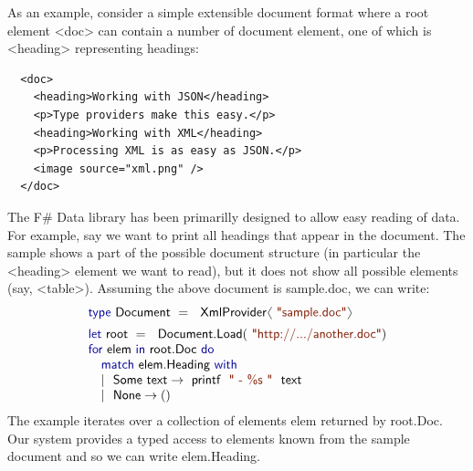 \documentclass[10pt,preprint,clearpagebib]{sigplanconf}
\newcommand{\langl}{\begin{picture}(4.5,7)
\put(1.1,2.5){\rotatebox{60}{\line(1,0){5.5}}}
\put(1.1,2.5){\rotatebox{300}{\line(1,0){5.5}}}
\end{picture}}
\newcommand{\rangl}{\begin{picture}(4.5,7)
\put(.9,2.5){\rotatebox{120}{\line(1,0){5.5}}}
\put(.9,2.5){\rotatebox{240}{\line(1,0){5.5}}}
\end{picture}}
\newcommand{\kvd}[1]{\textnormal{\textcolor{kvdclr}{\sffamily #1}}}
\newcommand{\str}[1]{\textnormal{\textcolor{strclr}{\sffamily "#1"}}}
\newcommand{\strf}[1]{\textnormal{\textcolor{strclr}{\sffamily #1}}}
\newcommand{\ident}[1]{\textnormal{\sffamily #1}}
\begin{document}
As an example, consider a simple extensible document format where a root element
{\ttfamily\small <doc>} can contain a number of document element, one of which is
{\ttfamily\small <heading>} representing headings:
%
{\small{
\begin{verbatim}
  <doc>
    <heading>Working with JSON</heading>
    <p>Type providers make this easy.</p>
    <heading>Working with XML</heading>
    <p>Processing XML is as easy as JSON.</p>
    <image source="xml.png" />
  </doc>
\end{verbatim}
}}
%
\noindent
The F\# Data library has been primarilly designed to allow easy reading of data. For example,
say we want to print all headings that appear in the document. The sample shows a part of the 
possible document structure (in particular the {\ttfamily\small <heading>} element we want to
read), but it does not show all possible elements (say, {\ttfamily\small <table>}). Assuming the
above document is \strf{sample.doc}, we can write:
%
\noindent
\begin{equation*}
\begin{array}{l}
 \kvd{type}~\ident{Document}~=~\ident{XmlProvider}\langl\str{sample.doc}\rangl\hspace{1em} \\[0.5em]
 \kvd{let}~\ident{root}~=~\ident{Document.Load}(\str{http://.../another.doc})\\
 \kvd{for}~\ident{elem}~\kvd{in}~\ident{root.Doc}~\kvd{do}\\
 \quad\kvd{match}~\ident{elem.Heading}~\kvd{with} \\
 \quad|~\ident{Some text} \rightarrow \ident{printf}~\str{ - \%s }~\ident{text}\\
 \quad|~\ident{None} \rightarrow ()\\
\end{array}
\end{equation*}
%
The example iterates over a collection of elements \ident{elem} returned by \ident{root.Doc}. 
Our system provides a typed access to elements known from the sample document and so we can
write \ident{elem.Heading}.
\end{document}
